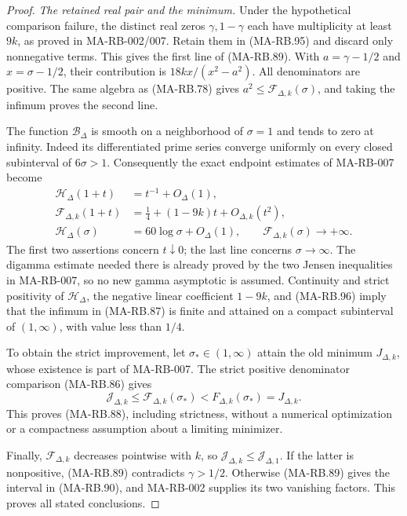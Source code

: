 \begin{proof}
\emph{The retained real pair and the minimum.}
Under the hypothetical comparison failure, the
distinct real zeros \(\gamma,1-\gamma\) each
have multiplicity at least \(9k\), as proved
in MA-RB-002/007. Retain them in (MA-RB.95)
and discard only nonnegative terms. This gives
the first line of (MA-RB.89).
With \(a=\gamma-1/2\) and \(x=\sigma-1/2\),
their contribution is \(18kx/(x^2-a^2)\).
All denominators are positive. The same algebra
as (MA-RB.78) gives
\(a^2\le\mathcal F_{\Delta,k}(\sigma)\), and
taking the infimum proves the second line.

The function \(\mathcal B_\Delta\) is smooth on a
neighborhood of \(\sigma=1\) and tends to zero
at infinity. Indeed its differentiated prime
series converge uniformly on every closed
subinterval of \(6\sigma>1\).
Consequently the exact endpoint estimates of
MA-RB-007 become
\[
 \begin{aligned}
 \mathcal H_\Delta(1+t)&=t^{-1}+O_\Delta(1),\\
 \mathcal F_{\Delta,k}(1+t)
       &=\tfrac14+(1-9k)t+O_{\Delta,k}(t^2),\\
 \mathcal H_\Delta(\sigma)
       &=60\log\sigma+O_\Delta(1),\qquad
 \mathcal F_{\Delta,k}(\sigma)\longrightarrow+\infty .
 \end{aligned}
 \tag{MA-RB.96}
\]
The first two assertions concern \(t\downarrow0\);
the last line concerns \(\sigma\to\infty\).
The digamma estimate needed there is already
proved by the two Jensen inequalities in
MA-RB-007, so no new gamma asymptotic is assumed.
Continuity and strict positivity of
\(\mathcal H_\Delta\), the negative linear
coefficient \(1-9k\), and (MA-RB.96) imply
that the infimum in (MA-RB.87) is finite
and attained on a compact subinterval of
\((1,\infty)\), with value less than \(1/4\).

To obtain the strict improvement, let
\(\sigma_*\in(1,\infty)\) attain the old
minimum \(J_{\Delta,k}\), whose existence
is part of MA-RB-007. The strict positive
denominator comparison (MA-RB.86) gives
\[
 \mathcal J_{\Delta,k}
   \le\mathcal F_{\Delta,k}(\sigma_*)
   <F_{\Delta,k}(\sigma_*)=J_{\Delta,k}.
\]
This proves (MA-RB.88), including strictness,
without a numerical optimization or a
compactness assumption about a limiting
minimizer.

Finally, \(\mathcal F_{\Delta,k}\) decreases
pointwise with \(k\), so
\(\mathcal J_{\Delta,k}\le\mathcal J_{\Delta,1}\).
If the latter is nonpositive, (MA-RB.89)
contradicts \(\gamma>1/2\). Otherwise
(MA-RB.89) gives the interval in (MA-RB.90),
and MA-RB-002 supplies its two vanishing
factors. This proves all stated conclusions.
\end{proof}

